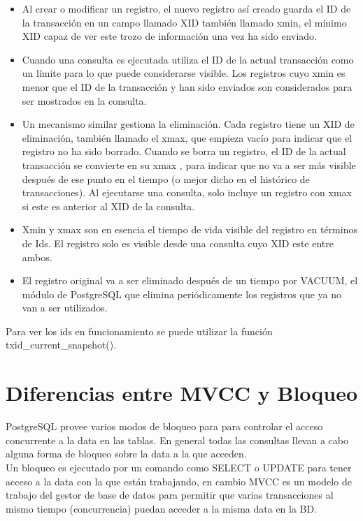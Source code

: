 \begin{itemize}
\item  Al crear o modificar un registro, el nuevo registro así creado guarda el ID de la transacción en un campo llamado XID también llamado xmin, el mínimo XID capaz de ver este trozo de información una vez ha sido enviado.
\item Cuando una consulta es ejecutada utiliza el ID de la actual transacción como un límite para lo que puede considerarse visible. Los registros cuyo xmin es menor que el ID de la transacción y han sido enviados son considerados para ser mostrados en la consulta.
\item Un mecanismo similar gestiona la eliminación. Cada registro tiene un XID de eliminación, también llamado el xmax, que empieza vacío para indicar que el registro no ha sido borrado. Cuando se borra un registro, el ID de la actual transacción se convierte en su xmax , para indicar que no va a ser más visible después de ese punto en el tiempo (o mejor dicho en el histórico de transacciones). Al ejecutarse una consulta, solo incluye un registro con xmax si este es anterior al XID de la consulta.
\item Xmin y xmax son en esencia el tiempo de vida visible del registro en términos de Ids. El registro solo es visible desde una consulta cuyo XID este entre ambos.
\item El registro original va a ser eliminado después de un tiempo por VACUUM, el módulo de PostgreSQL que elimina periódicamente los registros que ya no van a ser utilizados. \cite{GregorySmith2010}
\end{itemize}

Para ver los ids en funcionamiento se puede utilizar la función txid\_current\_snapshot().

\section{Diferencias entre MVCC y Bloqueo}

PostgreSQL provee varios modos de bloqueo para para controlar el acceso concurrente a la data en las tablas. En general todas las consultas llevan a cabo alguna forma de bloqueo sobre la data a la que acceden.\\

Un bloqueo es ejecutado por un comando como SELECT o UPDATE para tener acceso a la data con la que están trabajando, en cambio MVCC es un modelo de trabajo del gestor de base de datos para permitir que varias transacciones al mismo tiempo (concurrencia) puedan acceder a la misma data en la BD.\\


